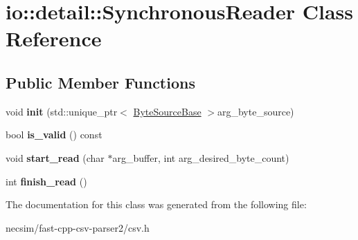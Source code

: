\hypertarget{classio_1_1detail_1_1_synchronous_reader}{}\section{io\+:\+:detail\+:\+:Synchronous\+Reader Class Reference}
\label{classio_1_1detail_1_1_synchronous_reader}
\subsection*{Public Member Functions}
\begin{DoxyCompactItemize}
\item 
void {\bfseries init} (std\+::unique\+\_\+ptr$<$ \hyperlink{classio_1_1_byte_source_base}{Byte\+Source\+Base} $>$arg\+\_\+byte\+\_\+source)\hypertarget{classio_1_1detail_1_1_synchronous_reader_a4dc78563ff667b92ad3096a94e834eb5}{}\label{classio_1_1detail_1_1_synchronous_reader_a4dc78563ff667b92ad3096a94e834eb5}

\item 
bool {\bfseries is\+\_\+valid} () const \hypertarget{classio_1_1detail_1_1_synchronous_reader_a963aaeed2b0a1177e16b88df61cab948}{}\label{classio_1_1detail_1_1_synchronous_reader_a963aaeed2b0a1177e16b88df61cab948}

\item 
void {\bfseries start\+\_\+read} (char $\ast$arg\+\_\+buffer, int arg\+\_\+desired\+\_\+byte\+\_\+count)\hypertarget{classio_1_1detail_1_1_synchronous_reader_a6cad1371b97e14f660914898b16433c4}{}\label{classio_1_1detail_1_1_synchronous_reader_a6cad1371b97e14f660914898b16433c4}

\item 
int {\bfseries finish\+\_\+read} ()\hypertarget{classio_1_1detail_1_1_synchronous_reader_a519a0cb25c641d2e51b6542749c44606}{}\label{classio_1_1detail_1_1_synchronous_reader_a519a0cb25c641d2e51b6542749c44606}

\end{DoxyCompactItemize}


The documentation for this class was generated from the following file\+:\begin{DoxyCompactItemize}
\item 
necsim/fast-\/cpp-\/csv-\/parser2/csv.\+h\end{DoxyCompactItemize}
